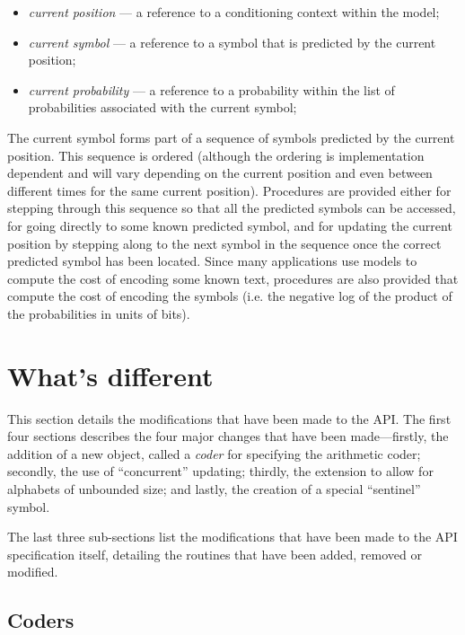 \documentclass[11pt]{article}
\begin{document}
\begin{itemize}
\item  \emph{current position} --- a reference to a conditioning context within
the model;

\item  \emph{current symbol} --- a reference to a symbol that is predicted by
the current position;

\item  \emph{current probability} --- a reference to a probability within the
list of probabilities associated with the current symbol;
\end{itemize}

The current symbol forms part of a sequence of symbols predicted by the
current position. This sequence is ordered (although the ordering is
implementation dependent and will vary depending on the current position and
even between different times for the same current position). Procedures are
provided either for stepping through this sequence so that all the predicted
symbols can be accessed, for going directly to some known predicted symbol,
and for updating the current position by stepping
along to the next symbol in the sequence once the correct predicted symbol has been located.
Since many applications use models to compute the cost of encoding some known text,
procedures are also provided that compute the cost of encoding the symbols
(i.e. the negative log of the product of the probabilities in units of bits).

\section{What's different}
\label{section.whats-new}

This section details the modifications that have been made to the API.
The first four sections describes the four major changes
that have been made---firstly, the addition of a new object, called a {\em coder}
for specifying the arithmetic coder; secondly, the use of ``concurrent''
updating; thirdly, the extension to allow for alphabets of unbounded size; and
lastly, the creation of a special ``sentinel'' symbol.

The last three sub-sections list the modifications that have been made to the
API specification itself, detailing the routines that have been added, removed
or modified.

\subsection{Coders}
\end{document}

